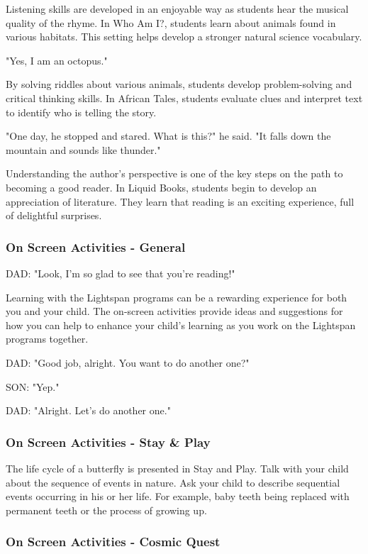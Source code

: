 Listening skills are developed in an enjoyable way as students hear the musical quality of the rhyme.
In Who Am I?, students learn about animals found in various habitats.
This setting helps develop a stronger natural science vocabulary.

"Yes, I am an octopus."

By solving riddles about various animals, students develop problem-solving and critical thinking skills.
In African Tales, students evaluate clues and interpret text to identify who is telling the story.

"One day, he stopped and stared. What is this?" he said. "It falls down the mountain and sounds like thunder."

Understanding the author's perspective is one of the key steps on the path to becoming a good reader.
In Liquid Books, students begin to develop an appreciation of literature.
They learn that reading is an exciting experience, full of delightful surprises.

\subsubsection{On Screen Activities - General}

DAD: "Look, I'm so glad to see that you're reading!"

Learning with the Lightspan programs can be a rewarding experience for both you and your child.
The on-screen activities provide ideas and suggestions for how you can help to enhance your child's learning as you work on the Lightspan programs together.

DAD: "Good job, alright. You want to do another one?"

SON: "Yep."

DAD: "Alright. Let's do another one."

\subsubsection{On Screen Activities - Stay \& Play}

The life cycle of a butterfly is presented in Stay and Play.
Talk with your child about the sequence of events in nature.
Ask your child to describe sequential events occurring in his or her life.
For example, baby teeth being replaced with permanent teeth or the process of growing up.

\subsubsection{On Screen Activities - Cosmic Quest}

